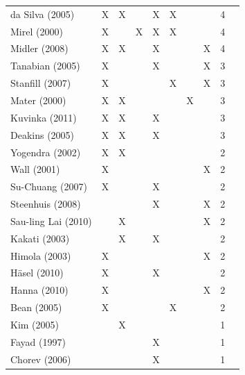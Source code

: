 \documentclass[10pt,journal,letterpaper,compsoc]{IEEEtran}
\begin{document}
\begin{table}[!t]
\begin{tabular}{|l||c||c||c||c||c||c||c||c||c|}
da Silva (2005) & X     & X     &       & X     & X     &       &       & 4     & \cite{Silva2005} \\
Mirel (2000) & X     &       & X     & X     & X     &       &       & 4     & \cite{Mirel2000} \\
Midler (2008) & X     & X     &       & X     &       &       & X     & 4     & \cite{Midler2008} \\
Tanabian (2005) & X     &       &       & X     &       &       & X     & 3     & \cite{Tanabian2005} \\
Stanfill (2007) & X     &       &       &       & X     &       & X     & 3     & \cite{Stanfill2007} \\
Mater (2000) & X     & X     &       &       &       & X     &       & 3     & \cite{Mater2000} \\
Kuvinka (2011) & X     & X     &       & X     &       &       &       & 3     & \cite{Kuvinka2011} \\
Deakins (2005) & X     & X     &       & X     &       &       &       & 3     & \cite{Deakins2005} \\
Yogendra (2002) & X     & X     &       &       &       &       &       & 2     & \cite{Yogendra2002} \\
Wall (2001) & X     &       &       &       &       &       & X     & 2     & \cite{Wall2001} \\
Su-Chuang (2007) & X     &       &       & X     &       &       &       & 2     & \cite{Su-Chan2007} \\
Steenhuis (2008) &       &       &       & X     &       &       & X     & 2     & \cite{Steenhuis2008} \\
Sau-ling Lai (2010) &       & X     &       &       &       &       & X     & 2     & \cite{Lai2010} \\
Kakati (2003) &       & X     &       & X     &       &       &       & 2     & \cite{Kakati2003} \\
Himola (2003) & X     &       &       &       &       &       & X     & 2     & \cite{Hilmola2003} \\
H\"{a}sel (2010) & X     &       &       & X     &       &       &       & 2     & \cite{Hasel2010} \\
Hanna (2010) & X     &       &       &       &       &       & X     & 2     & \cite{Hanna2010} \\
Bean (2005) & X     &       &       &       & X     &       &       & 2     & \cite{Bean2005} \\
Kim (2005) &       & X     &       &       &       &       &       & 1     & \cite{Kim2005} \\
Fayad (1997) &       &       &       & X     &       &       &       & 1     & \cite{Fayad1997} \\
Chorev (2006) &       &       &       & X     &       &       &       & 1     & \cite{Chorev2006} \\
\hline
\end{tabular}
\end{table}
 
\end{document}
